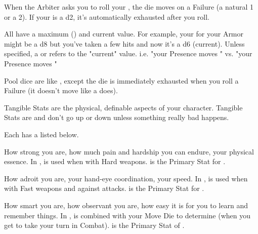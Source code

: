 {

When the Arbiter asks you to roll your \UD, the die moves \DCDOWN on a Failure (a natural 1 or a 2).  If your \UD is a d2, it's automatically exhausted after you roll.  

All \UD have a maximum (\MAX) and current value.  For example, your \UD for your Armor might be a d8 \MAX but you've taken a few hits and now it's a d6 (current).  Unless specified, a \DCDOWN or \DCUP refers to the "current" value.  i.e.  "your Presence moves \DCDOWN" vs. "your \MAX Presence moves \DCDOWN"


Pool dice are like \UD, except the die is immediately exhausted when you roll a Failure (it doesn't move \DCDOWN like a \UD does).  

\newpage


Tangible Stats are the physical, definable aspects of your character.  Tangible Stats are \STATIC and don't go up or down unless something really bad happens.

Each  has a  listed below.


How strong you are, how much pain and hardship you can endure, your physical essence.  In , \VIG is used when  with Hard weapons. \VIG is the Primary Stat for . 


How adroit you are, your hand-eye coordination, your speed.  In , \DEX is used when  with Fast weapons and  against attacks. \DEX is the Primary Stat for .  



How smart you are, how observant you are, how easy it is for you to learn and remember things. In , \INT is combined with your Move Die to determine  (when you get to take your turn in Combat). \INT is the Primary Stat of .  


}
